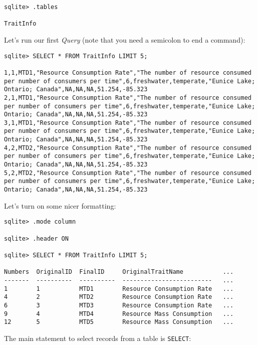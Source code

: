 \begin{lstlisting}
sqlite> .tables

TraitInfo
\end{lstlisting}

Let's run our first {\it Query} (note that you need a semicolon to end 
a command):

\begin{lstlisting}
sqlite> SELECT * FROM TraitInfo LIMIT 5;

1,1,MTD1,"Resource Consumption Rate","The number of resource consumed per number of consumers per time",6,freshwater,temperate,"Eunice Lake; Ontario; Canada",NA,NA,NA,51.254,-85.323
2,1,MTD1,"Resource Consumption Rate","The number of resource consumed per number of consumers per time",6,freshwater,temperate,"Eunice Lake; Ontario; Canada",NA,NA,NA,51.254,-85.323
3,1,MTD1,"Resource Consumption Rate","The number of resource consumed per number of consumers per time",6,freshwater,temperate,"Eunice Lake; Ontario; Canada",NA,NA,NA,51.254,-85.323
4,2,MTD2,"Resource Consumption Rate","The number of resource consumed per number of consumers per time",6,freshwater,temperate,"Eunice Lake; Ontario; Canada",NA,NA,NA,51.254,-85.323
5,2,MTD2,"Resource Consumption Rate","The number of resource consumed per number of consumers per time",6,freshwater,temperate,"Eunice Lake; Ontario; Canada",NA,NA,NA,51.254,-85.323

\end{lstlisting}
  
Let's turn on some nicer formatting:

\begin{lstlisting}
sqlite> .mode column

sqlite> .header ON

sqlite> SELECT * FROM TraitInfo LIMIT 5;

Numbers  OriginalID  FinalID     OriginalTraitName           ... 
-------  ----------  ----------  -------------------------   ...
1        1           MTD1        Resource Consumption Rate   ...
4        2           MTD2        Resource Consumption Rate   ...
6        3           MTD3        Resource Consumption Rate   ...
9        4           MTD4        Resource Mass Consumption   ...
12       5           MTD5        Resource Mass Consumption   ...

\end{lstlisting}
  
The main statement to select records from a table is {\tt SELECT}:
 

